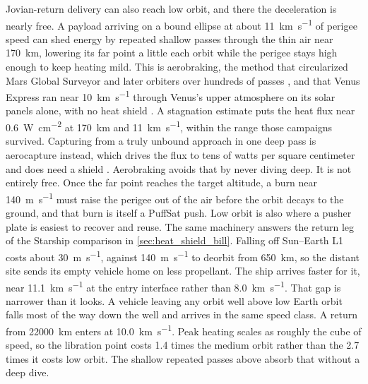 \documentclass{article}
\begin{document}
Jovian-return delivery can also reach low orbit, and there the deceleration is nearly free. A payload arriving on a bound ellipse at about \SI{11}{\kilo\meter\per\second} of perigee speed can shed energy by repeated shallow passes through the thin air near \SI{170}{\kilo\meter}, lowering its far point a little each orbit while the perigee stays high enough to keep heating mild. This is aerobraking, the method that circularized Mars Global Surveyor and later orbiters over hundreds of passes \cite{nasa_mars_aerobraking}, and that Venus Express ran near \SI{10}{\kilo\meter\per\second} through Venus's upper atmosphere on its solar panels alone, with no heat shield \cite{esa_venus_express_aerobraking}. A stagnation estimate puts the heat flux near \SI{0.6}{\watt\per\centi\meter\squared} at \SI{170}{\kilo\meter} and \SI{11}{\kilo\meter\per\second}, within the range those campaigns survived. Capturing from a truly unbound approach in one deep pass is aerocapture instead, which drives the flux to tens of watts per square centimeter and does need a shield \cite{aerocapture_review}. Aerobraking avoids that by never diving deep. It is not entirely free. Once the far point reaches the target altitude, a burn near \SI{140}{\meter\per\second} must raise the perigee out of the air before the orbit decays to the ground, and that burn is itself a PuffSat push. Low orbit is also where a pusher plate is easiest to recover and reuse. The same machinery answers the return leg of the Starship comparison in \autoref{sec:heat_shield_bill}. Falling off Sun--Earth L1 costs about \SI{30}{\meter\per\second}, against \SI{140}{\meter\per\second} to deorbit from \SI{650}{\kilo\meter}, so the distant site sends its empty vehicle home on less propellant. The ship arrives faster for it, near \SI{11.1}{\kilo\meter\per\second} at the entry interface rather than \SI{8.0}{\kilo\meter\per\second}. That gap is narrower than it looks. A vehicle leaving any orbit well above low Earth orbit falls most of the way down the well and arrives in the same speed class. A return from \SI{22000}{\kilo\meter} enters at \SI{10.0}{\kilo\meter\per\second}. Peak heating scales as roughly the cube of speed, so the libration point costs 1.4 times the medium orbit rather than the 2.7 times it costs low orbit. The shallow repeated passes above absorb that without a deep dive.
\end{document}
